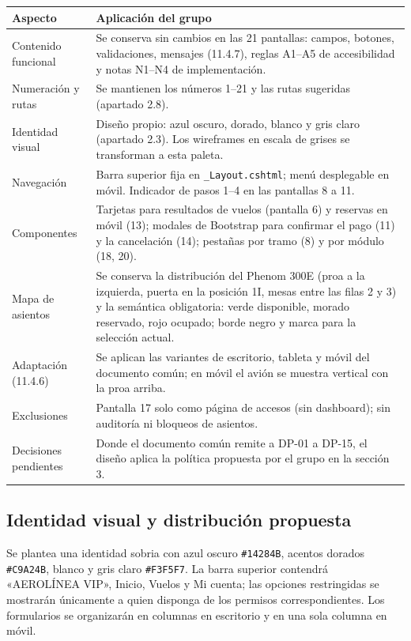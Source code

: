 \documentclass[11pt,a4paper]{article}
\begin{document}
\begin{tabularx}{\textwidth}{@{}p{3.6cm}X@{}}
\toprule
\textbf{Aspecto} & \textbf{Aplicación del grupo}\\\midrule
Contenido funcional & Se conserva sin cambios en las 21 pantallas: campos, botones, validaciones, mensajes (11.4.7), reglas A1--A5 de accesibilidad y notas N1--N4 de implementación.\\
Numeración y rutas & Se mantienen los números 1--21 y las rutas sugeridas (apartado 2.8).\\
Identidad visual & Diseño propio: azul oscuro, dorado, blanco y gris claro (apartado 2.3). Los wireframes en escala de grises se transforman a esta paleta.\\
Navegación & Barra superior fija en \texttt{\_Layout.cshtml}; menú desplegable en móvil. Indicador de pasos 1--4 en las pantallas 8 a 11.\\
Componentes & Tarjetas para resultados de vuelos (pantalla 6) y reservas en móvil (13); modales de Bootstrap para confirmar el pago (11) y la cancelación (14); pestañas por tramo (8) y por módulo (18, 20).\\
Mapa de asientos & Se conserva la distribución del Phenom 300E (proa a la izquierda, puerta en la posición 1I, mesas entre las filas 2 y 3) y la semántica obligatoria: verde disponible, morado reservado, rojo ocupado; borde negro y marca para la selección actual.\\
Adaptación (11.4.6) & Se aplican las variantes de escritorio, tableta y móvil del documento común; en móvil el avión se muestra vertical con la proa arriba.\\
Exclusiones & Pantalla 17 solo como página de accesos (sin dashboard); sin auditoría ni bloqueos de asientos.\\
Decisiones pendientes & Donde el documento común remite a DP-01 a DP-15, el diseño aplica la política propuesta por el grupo en la sección 3.\\\bottomrule
\end{tabularx}

\subsection{Identidad visual y distribución propuesta}
Se plantea una identidad sobria con azul oscuro \texttt{\#14284B}, acentos dorados \texttt{\#C9A24B}, blanco y gris claro \texttt{\#F3F5F7}. La barra superior contendrá «AEROLÍNEA VIP», Inicio, Vuelos y Mi cuenta; las opciones restringidas se mostrarán únicamente a quien disponga de los permisos correspondientes. Los formularios se organizarán en columnas en escritorio y en una sola columna en móvil.
\end{document}
